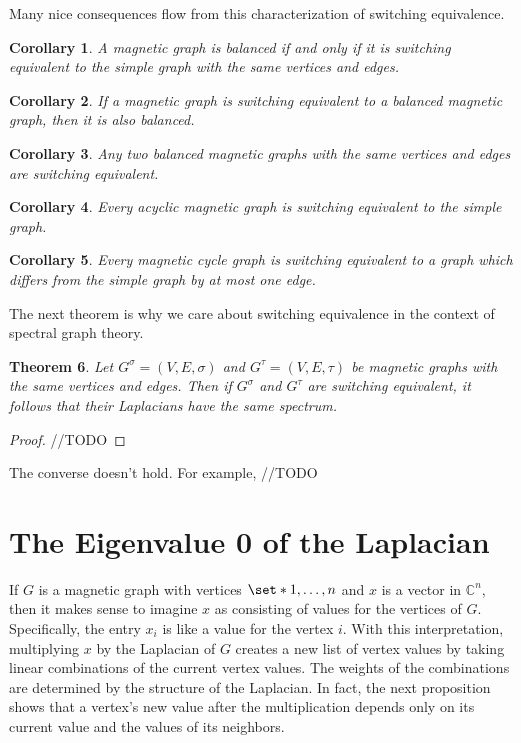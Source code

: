 \documentclass[12pt]{article}
\newtheorem{thm}{Theorem}
\newtheorem{corollary}[thm]{Corollary}
\theoremstyle{definition}
\newcommand{\C}{\mathbb C}
\begin{document}
Many nice consequences flow from this characterization of switching equivalence. 

\begin{corollary}\label{balanced iff switching equivalent to simple graph}
A magnetic graph is balanced if and only if it is switching equivalent to the simple graph with the same vertices and edges.
\end{corollary}

\begin{corollary}
If a magnetic graph is switching equivalent to a balanced magnetic graph, then it is also balanced.  
\end{corollary}

\begin{corollary}
Any two balanced magnetic graphs with the same vertices and edges are switching equivalent. 
\end{corollary}

\begin{corollary}
Every acyclic magnetic graph is switching equivalent to the simple graph.
\end{corollary}

\begin{corollary}
Every magnetic cycle graph is switching equivalent to a graph which differs from the simple graph by at most one edge. 
\end{corollary}

The next theorem is why we care about switching equivalence in the context of spectral graph theory.

\begin{thm}\label{switching preserves spectrum}
Let $G^\sigma = (V, E, \sigma)$ and $G^\tau = (V, E, \tau)$ be magnetic graphs with the same vertices and edges. Then if $G^\sigma$ and $G^\tau$ are switching equivalent, it follows that their Laplacians have the same spectrum.
\end{thm}
\begin{proof}
//TODO
\end{proof}

The converse doesn't hold. For example, //TODO

\section{The Eigenvalue 0 of the Laplacian}

If $G$ is a magnetic graph with vertices $\set*{1, \dots, n}$ and $x$ is a vector in $\C^n$, then it makes sense to imagine $x$ as consisting of values for the vertices of $G$. Specifically, the entry $x_i$ is like a value for the vertex $i$. With this interpretation, multiplying $x$ by the Laplacian of $G$ creates a new list of vertex values by taking linear combinations of the current vertex values. The weights of the combinations are determined by the structure of the Laplacian. In fact, the next proposition shows that a vertex's new value after the multiplication depends only on its current value and the values of its neighbors.   
\end{document}
